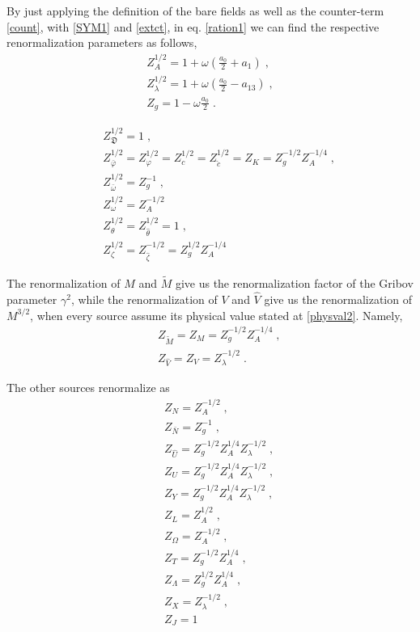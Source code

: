 \begin{appendix}
\noindent By just applying the definition of the bare fields as well as the counter-term \eqref{count}, with \eqref{SYM1} and \eqref{extct}, in eq. \eqref{ration1} we can find the respective renormalization parameters as follows,
\begin{eqnarray}
Z^{1/2}_{A} = 1 + \omega\left(\frac{a_{0}}{2}+a_{1}\right)\;, \nonumber \\
Z^{1/2}_{\lambda} = 1+ \omega \left(\frac{a_{0}}{2}-a_{13}\right)\;, \nonumber \\
Z_{g}=1-\omega\frac{a_{0}}{2}\;.
\end{eqnarray}

\begin{eqnarray}
&&
Z_{\mathfrak{D}}^{1/2}=1\;, \nonumber \\
&&
Z^{1/2}_{\bar{\varphi}} = Z^{1/2}_{\varphi} = Z^{1/2}_{c}=Z^{1/2}_{\check{c}} = Z_{K} = Z^{-1/2}_{g}Z^{-1/4}_{A}\;, \nonumber \\
&&
Z^{1/2}_{\bar{\omega}} = Z^{-1}_{g}\;, \nonumber \\
&&
Z^{1/2}_{\omega} = Z^{-1/2}_{A} \nonumber \\
&&
Z^{1/2}_{\theta}=Z^{1/2}_{\hat{\theta}} = 1\;, \nonumber \\
&&
Z^{1/2}_{\zeta}=Z^{-1/2}_{\hat{\zeta}} = Z^{1/2}_{g}Z^{-1/4}_{A}
\end{eqnarray}

\noindent The renormalization of $M$ and $\tilde{M}$ give us the renormalization factor of the Gribov parameter $\gamma^{2}$, while the renormalization of $V$ and $\hat{V}$ give us the renormalization of $M^{3/2}$, when every source assume its physical value stated at \eqref{physval2}.
 Namely,
\begin{eqnarray}
&&
Z_{\tilde{M}} =Z_{M} = Z^{-1/2}_{g}Z^{-1/4}_{A}\;, \nonumber \\
&&
Z_{\hat{V}} =Z_{V} = Z^{-1/2}_{\lambda}\;.
\end{eqnarray}

\noindent The other sources renormalize as
\begin{eqnarray}
&&
Z_{N} = Z^{-1/2}_{A}\;, \nonumber \\
&&
Z_{\bar{N}} = Z^{-1}_{g}\;, \nonumber \\
&&
Z_{\hat{U}} = Z^{-1/2}_{g}Z^{1/4}_{A}Z^{-1/2}_{\lambda}\;, \nonumber \\
&&
Z_{U} = Z^{-1/2}_{g}Z^{1/4}_{A}Z^{-1/2}_{\lambda}\;, \nonumber \\
&&
Z_{Y} = Z^{-1/2}_{g}Z^{1/4}_{A}Z^{-1/2}_{\lambda}\;, \nonumber \\
&&
Z_{L} = Z^{1/2}_{A}\;, \nonumber \\
&&
Z_{\Omega} = Z^{-1/2}_{A}\;, \nonumber \\
&&
Z_{T} = Z^{-1/2}_{g}Z^{1/4}_{A}\;, \nonumber \\
&&
Z_{\Lambda} = Z^{1/2}_{g}Z^{1/4}_{A}\;, \nonumber \\
&&
Z_{X} = Z^{-1/2}_{\lambda}\;, \nonumber \\
&&
Z_{J} = 1
\end{eqnarray}


\end{appendix}
